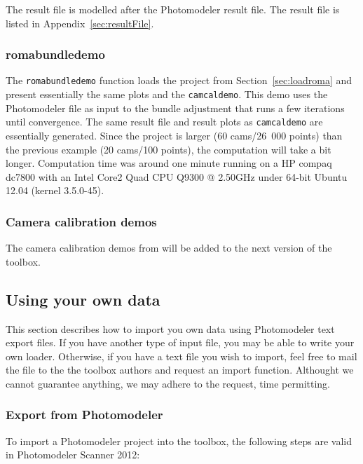\documentclass{article}
\begin{document}
The result file is modelled after the Photomodeler result file.
The result file is listed in Appendix~\ref{sec:resultFile}.

\subsubsection{romabundledemo}

The \texttt{romabundledemo} function loads the project from
Section~\ref{sec:loadroma} and present essentially the same plots and
the \texttt{camcaldemo}. This demo uses the Photomodeler file as input
to the bundle adjustment that runs a few iterations until convergence.
The same result file and result plots as \texttt{camcaldemo} are
essentially generated. Since the project is larger (60 cams/26~000
points) than the previous example (20 cams/100 points), the
computation will take a bit longer. Computation time was around one
minute running on a HP compaq dc7800 with an Intel Core2 Quad CPU
Q9300 @ 2.50GHz under 64-bit Ubuntu 12.04 (kernel 3.5.0-45).

\subsubsection{Camera calibration demos}

The camera calibration demos from \citet{Borlin2014:Camera} will be
added to the next version of the toolbox.

\subsection{Using your own data}

This section describes how to import you own data using Photomodeler
text export files. If you have another type of input file, you may be
able to write your own loader. Otherwise, if you have a text file you
wish to import, feel free to mail the file to the the toolbox authors
and request an import function. Althought we cannot guarantee
anything, we may adhere to the request, time permitting.

\subsubsection{Export from Photomodeler}

To import a Photomodeler project into the toolbox, the following
steps are valid in Photomodeler Scanner 2012:
\end{document}
